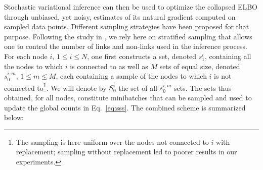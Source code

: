 Stochastic variational inference can then be used to optimize the collapsed ELBO through unbiased, yet noisy, estimates of its natural gradient computed on sampled data points. Different sampling strategies \cite{gopalan2013efficient,kim2013efficient} have been proposed for that purpose. Following the study in \cite{gopalan2013efficient}, we rely here on stratified sampling that allows one to control the number of links and non-links used in the inference process. For each node $i, \, 1 \le i \le N$, one first constructs a set, denoted $s_1^i$, containing all the nodes to which $i$ is connected to as well as $M$ sets of equal size, denoted $s_0^{i,m}, \, 1 \le m \le M$, each containing a sample of the nodes to which $i$ is not connected to\footnote{The sampling is here uniform over the nodes not connected to $i$ with replacement; sampling without replacement led to poorer results in our experiments.}. We will denote by $S_0^i$ the set of all $s_0^{i,m}$ sets. The sets thus obtained, for all nodes, constitute minibatches that can be sampled and used to update the global counts in Eq.~\ref{eq:sss}. The combined scheme is summarized below:
%
